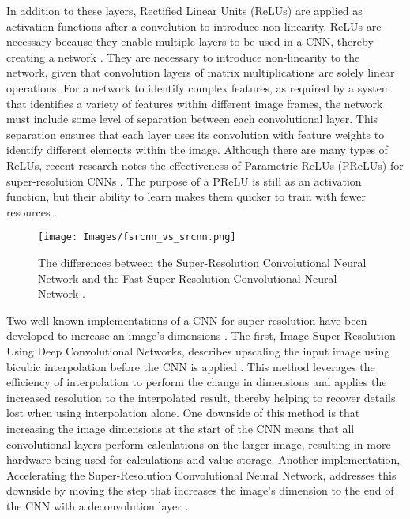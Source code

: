 \documentclass{article}
\begin{document}
    \par In addition to these layers, Rectified Linear Units (ReLUs) are applied as activation functions after a convolution to introduce non-linearity. ReLUs are necessary because they enable multiple layers to be used in a CNN, thereby creating a network \cite{machine_learning_in_plain_english_convolutional_2023}. They are necessary to introduce non-linearity to the network, given that convolution layers of matrix multiplications are solely linear operations. For a network to identify complex features, as required by a system that identifies a variety of features within different image frames, the network must include some level of separation between each convolutional layer. This separation ensures that each layer uses its convolution with feature weights to identify different elements within the image. Although there are many types of ReLUs, recent research notes the effectiveness of Parametric ReLUs (PReLUs) for super-resolution CNNs \cite{he_fpga_based_2018}. The purpose of a PReLU is still as an activation function, but their ability to learn makes them quicker to train with fewer resources \cite{he_delving_2015}.

    \begin{figure}[!tb] 
        \centering
        \texttt{[image: Images/fsrcnn\_vs\_srcnn.png]} 
        \caption{The differences between the Super-Resolution Convolutional Neural Network and the Fast Super-Resolution Convolutional Neural Network \cite{fsrcnn_dong_accelerating_2016}.} 
        \label{fig:fsrcnn_srcnn} 
    \end{figure}

    \par Two well-known implementations of a CNN for super-resolution have been developed to increase an image's dimensions \cite{fsrcnn_dong_accelerating_2016}\cite{dong_image_2015}. The first, Image Super-Resolution Using Deep Convolutional Networks, describes upscaling the input image using bicubic interpolation before the CNN is applied \cite{dong_image_2015}. This method leverages the efficiency of interpolation to perform the change in dimensions and applies the increased resolution to the interpolated result, thereby helping to recover details lost when using interpolation alone. One downside of this method is that increasing the image dimensions at the start of the CNN means that all convolutional layers perform calculations on the larger image, resulting in more hardware being used for calculations and value storage. Another implementation, Accelerating the Super-Resolution Convolutional Neural Network, addresses this downside by moving the step that increases the image’s dimension to the end of the CNN with a deconvolution layer \cite{fsrcnn_dong_accelerating_2016}. 
\end{document}
